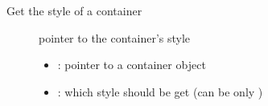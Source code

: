\documentclass[letterpaper,10pt,english]{sphinxmanual}
\begin{document}

\begin{fulllineitems}
\label{\detokenize{object-types/cont:_CPPv417lv_cont_get_stylePK8lv_obj_t15lv_cont_style_t}}%
\pysigstartmultiline
{}\label{\detokenize{object-types/cont:lv__cont_8h_1a022160cd4a4b665c86329c9973ce4031}}%
\pysigstopmultiline
Get the style of a container \begin{description}
\item[{}] \leavevmode
pointer to the container’s style 

\item[{}] \leavevmode\begin{itemize}
\item {} 
: pointer to a container object 

\item {} 
: which style should be get (can be only ) 

\end{itemize}

\end{description}


\end{fulllineitems}

\end{document}
